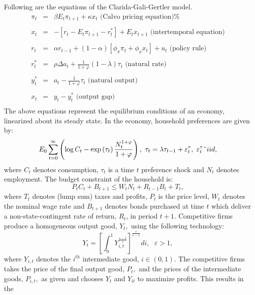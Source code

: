 Following are the equations of the Clarida-Gali-Gertler model. 
\begin{eqnarray*}
\pi _{t} &=&\beta E_{t}\pi _{t+1}+\kappa x_{t}\text{ (Calvo pricing equation)%
} \\
&& \\
x_{t} &=&-\left[ r_{t}-E_{t}\pi _{t+1}-r_{t}^{\ast }\right] +E_{t}x_{t+1}%
\text{ (intertemporal equation)} \\
&& \\
r_{t} &=&\alpha r_{t-1}+(1-\alpha )\left[ \phi _{\pi }\pi _{t}+\phi _{x}x_{t}%
\right] +u_{t}\text{ (policy rule)} \\
&& \\
r_{t}^{\ast } &=&\rho \Delta a_{t}+\frac{1}{1+\varphi }\left( 1-\lambda
\right) \tau _{t}\text{ (natural rate)} \\
&& \\
y_{t}^{\ast } &=&a_{t}-\frac{1}{1+\varphi }\tau _{t}\text{ (natural output)}
\\
&& \\
x_{t} &=&y_{t}-y_{t}^{\ast }\text{ (output gap)} \\
&&
\end{eqnarray*}%
The above equations represent the equilibrium conditions of an economy,
linearized about its steady state. In the economy, household preferences are
given by:%
\[
E_{0}\sum_{t=0}^{\infty }\left( \log C_{t}-\exp \left( \tau _{t}\right) 
\frac{N_{t}^{1+\varphi }}{1+\varphi }\right) ,\text{ }\tau _{t}=\lambda \tau
_{t-1}+\varepsilon _{t}^{\tau },\text{ }\varepsilon _{t}^{\tau }\symbol{126}%
iid, 
\]%
where $C_{t}$ denotes consumption, $\tau _{t}$ is a time $t$ preference
shock and $N_{t}$ denotes employment. The budget constraint of the household
is:%
\[
P_{t}C_{t}+B_{t+1}\leq W_{t}N_{t}+R_{t-1}B_{t}+T_{t}, 
\]%
where $T_{t}$ denotes (lump sum) taxes and profits, $P_{t}$ is the price
level, $W_{t}$ denotes the nominal wage rate and $B_{t+1}$ denotes bonds
purchased at time $t$ which deliver a non-state-contingent rate of return, $%
R_{t}$, in period $t+1.$ Competitive firms produce a homogeneous output
good, $Y_{t},$ using the following technology:%
\[
Y_{t}=\left[ \int_{0}^{1}Y_{i,t}^{\frac{\varepsilon -1}{\varepsilon }}\right]
^{\frac{\varepsilon }{\varepsilon -1}}di,\text{ }\varepsilon >1, 
\]%
where $Y_{i,t}$ denotes the $i^{th}$ intermediate good, $i\in \left(
0,1\right) .$ The competitive firms takes the price of the final output
good, $P_{t},$ and the prices of the intermediate goods, $P_{i,t},$ as given
and chooses $Y_{t}$ and $Y_{it}$ to maximize profits. This results in the

